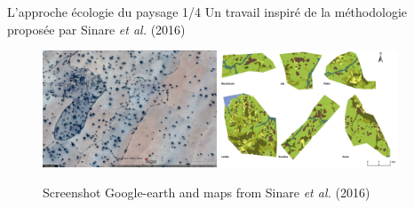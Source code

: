 \documentclass[newPxFont]{beamer}
\begin{document}
\begin{frame}[c]{L'approche écologie du paysage 1/4}
\vspace{-1cm}
Un travail inspiré de la méthodologie proposée par Sinare \textit{et al.} (2016)
\begin{figure}
	\centering
	\includegraphics[height = 3.5cm]{img/ggearth}
  \includegraphics[height = 3.5cm]{img/Sinare_et_al2016}
  \caption{\small{Screenshot Google-earth and maps from Sinare \textit{et al.} (2016)}}
\end{figure}
\end{frame}

\end{document}

